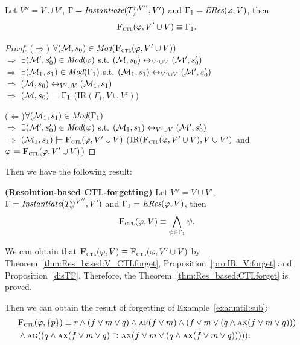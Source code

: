 \documentclass[runningheads]{llncs}
\newcommand{\Mod}{\textit{Mod}}
\newcommand{\lrto}{\leftrightarrow}
\newcommand{\Rto}{\Rightarrow}
\newcommand{\Lto}{\Leftarrow}
\newcommand{\Hm} {{\cal M}}
\newcommand{\Elm}{\textit{Elm}}
\newcommand{\CTL}{\textrm{CTL}}
\newcommand{\NI}{\textrm{NI}}
\newcommand{\ALL}{\textsc{a}}
\newcommand{\EXIST}{\textsc{e}}
\newcommand{\NEXT}{\textsc{x}}
\newcommand{\FUTURE}{\textsc{f}}
\newcommand{\GLOBAL}{\textsc{g}}
\newcommand{\IR}{\textrm{IR}}
\newcommand{\CTLforget}{{\textsc{F}_{\textsc{ctl}}}}
\begin{document}
\begin{theorem}\label{thm:Res_based:V_CTLforget}
Let $V''=V \cup V'$, $\Gamma=\emph{Instantiate}(T_{\varphi}^{r, V''}, V')$ and $\Gamma_1=\emph{ERes}(\varphi,V)$, then %
\[
\CTLforget(\varphi, V' \cup V) \equiv \Gamma_1.
\]
\end{theorem}
\begin{proof}
 ($\Rto$) $\forall (\Hm,s_0) \in \Mod(\CTLforget(\varphi, V' \cup V))$\\
 $\Rto$ $\exists (\Hm',s_0') \in \Mod(\varphi)$ s.t. $(\Hm,s_0) \lrto_{V'\cup V} (\Hm', s_0')$\\
 $\Rto$ $\exists (\Hm_1, s_1) \in \Mod(\Gamma_1)$ s.t. $(\Hm_1,s_1) \lrto_{V'\cup V} (\Hm', s_0')$\\
 $\Rto$ $(\Hm,s_0) \lrto_{V'\cup V} (\Hm_1,s_1)$\\
 $\Rto$ $(\Hm,s_0) \models \Gamma_1$ \hfill ($\IR(\Gamma_1, V \cup V')$)

 ($\Lto$)$\forall (\Hm_1, s_1) \in \Mod(\Gamma_1)$\\
 $\Rto$ $\exists (\Hm',s_0') \in \Mod(\varphi)$ s.t. $(\Hm_1,s_1) \lrto_{V'\cup V} (\Hm', s_0')$ \\
 $\Rto$ $(\Hm_1, s_1) \models \CTLforget(\varphi, V' \cup V)$ \hfill ($\IR(\CTLforget(\varphi, V' \cup V), V \cup V')$ and $\varphi \models \CTLforget(\varphi, V' \cup V)$)
\end{proof}

Then we have the following result:
\begin{theorem}\label{thm:Res_based:CTLforget}
\textbf{(Resolution-based CTL-forgetting)}
Let $V''=V \cup V'$, $\Gamma=\emph{Instantiate}(T_{\varphi}^{r, V''}, V')$ and $\Gamma_1=\emph{ERes}(\varphi, V)$, then
\[
\CTLforget(\varphi, V) \equiv \bigwedge_{\psi \in \Gamma_1} \psi.
\]
\end{theorem}

We can obtain that $\CTLforget(\varphi, V) \equiv \CTLforget(\varphi, V' \cup V)$ by Theorem~\ref{thm:Res_based:V_CTLforget}, Proposition~\ref{pro:IR_V:forget} and Proposition~\ref{disTF}. Therefore, the Theorem~\ref{thm:Res_based:CTLforget} is proved.

Then we can obtain the result of forgetting of Example~\ref{exa:until:sub}:
\begin{align*}
& \CTLforget(\varphi, \{p\}) \equiv r\wedge (f\vee m \vee q)  \wedge \ALL\FUTURE(f \vee m) \wedge (f\vee m \vee (q\wedge \ALL\NEXT(f\vee m\vee q))) \\
& \wedge \ALL\GLOBAL((q\wedge \ALL\NEXT(f\vee m\vee q)
 \supset \ALL\NEXT(f\vee m \vee (q\wedge \ALL\NEXT(f\vee m\vee q))))).
\end{align*}
\end{document}
